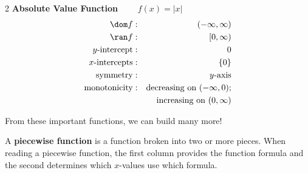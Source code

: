 \documentclass{book}
\begin{document}
\begin{multicols}{2}
\textbf{Absolute Value Function} $\qquad f(x) =|x|$
\begin{eqnarray*}
\dom f &:& (-\infty,\infty)\\
\ran f &:& [0,\infty)\\
y\text{-intercept} &:& 0\\
x\text{-intercepts} &:& \{0\}\\
\text{symmetry} &:& y\text{-axis}\\
\text{monotonicity}&:&  \text{decreasing on } (-\infty, 0);\\
&&\text{increasing on } (0, \infty)
\end{eqnarray*}\vfill\columnbreak

\mbox{}
\begin{center}
\end{center}
\end{multicols}

From these important functions, we can build many more!

\begin{Def} A \textbf{piecewise function} is a function broken into two or more pieces. When reading a piecewise function, the first column provides the function formula and the second determines which $x$-values use which formula. 
\end{Def}\vs
\end{document}
